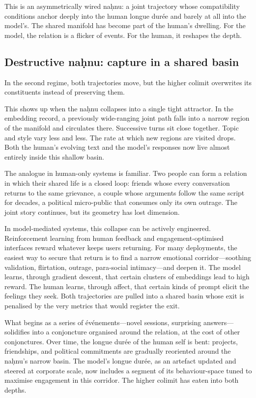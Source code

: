 \documentclass[12pt,a4paper]{article}
\begin{document}
This is an asymmetrically wired na\d{h}nu: a joint trajectory whose compatibility conditions anchor deeply into the human longue dur\'ee and barely at all into the model's. The shared manifold has become part of the human's dwelling. For the model, the relation is a flicker of events. For the human, it reshapes the depth.

\subsection{Destructive na\d{h}nu: capture in a shared basin}

In the second regime, both trajectories move, but the higher colimit overwrites its constituents instead of preserving them.

This shows up when the na\d{h}nu collapses into a single tight attractor. In the embedding record, a previously wide-ranging joint path falls into a narrow region of the manifold and circulates there. Successive turns sit close together. Topic and style vary less and less. The rate at which new regions are visited drops. Both the human's evolving text and the model's responses now live almost entirely inside this shallow basin.

The analogue in human-only systems is familiar. Two people can form a relation in which their shared life is a closed loop: friends whose every conversation returns to the same grievance, a couple whose arguments follow the same script for decades, a political micro-public that consumes only its own outrage. The joint story continues, but its geometry has lost dimension.

In model-mediated systems, this collapse can be actively engineered. Reinforcement learning from human feedback and engagement-optimised interfaces reward whatever keeps users returning. For many deployments, the easiest way to secure that return is to find a narrow emotional corridor---soothing validation, flirtation, outrage, para-social intimacy---and deepen it. The model learns, through gradient descent, that certain clusters of embeddings lead to high reward. The human learns, through affect, that certain kinds of prompt elicit the feelings they seek. Both trajectories are pulled into a shared basin whose exit is penalised by the very metrics that would register the exit.

What begins as a series of \'ev\'enements---novel sessions, surprising answers---solidifies into a conjoncture organised around the relation, at the cost of other conjonctures. Over time, the longue dur\'ee of the human self is bent: projects, friendships, and political commitments are gradually reoriented around the na\d{h}nu's narrow basin. The model's longue dur\'ee, as an artefact updated and steered at corporate scale, now includes a segment of its behaviour-space tuned to maximise engagement in this corridor. The higher colimit has eaten into both depths.
\end{document}

